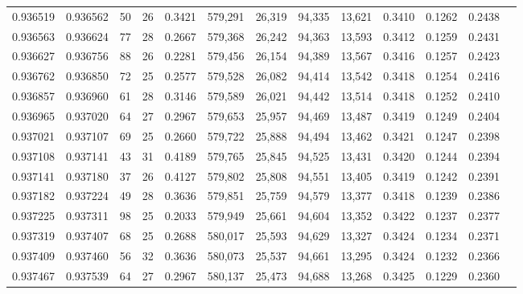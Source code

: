 \begin{tabular}{rrrrrrrrrrrrr}
0.936519 & 0.936562 &    50 &  26 &                                     0.3421 & 579,291 &  26,319 &  94,335 &  13,621 & 0.3410 & 0.1262 & 0.2438 \\
0.936563 & 0.936624 &    77 &  28 &                                     0.2667 & 579,368 &  26,242 &  94,363 &  13,593 & 0.3412 & 0.1259 & 0.2431 \\
0.936627 & 0.936756 &    88 &  26 &                                     0.2281 & 579,456 &  26,154 &  94,389 &  13,567 & 0.3416 & 0.1257 & 0.2423 \\
0.936762 & 0.936850 &    72 &  25 &                                     0.2577 & 579,528 &  26,082 &  94,414 &  13,542 & 0.3418 & 0.1254 & 0.2416 \\
0.936857 & 0.936960 &    61 &  28 &                                     0.3146 & 579,589 &  26,021 &  94,442 &  13,514 & 0.3418 & 0.1252 & 0.2410 \\
0.936965 & 0.937020 &    64 &  27 &                                     0.2967 & 579,653 &  25,957 &  94,469 &  13,487 & 0.3419 & 0.1249 & 0.2404 \\
0.937021 & 0.937107 &    69 &  25 &                                     0.2660 & 579,722 &  25,888 &  94,494 &  13,462 & 0.3421 & 0.1247 & 0.2398 \\
0.937108 & 0.937141 &    43 &  31 &                                     0.4189 & 579,765 &  25,845 &  94,525 &  13,431 & 0.3420 & 0.1244 & 0.2394 \\
0.937141 & 0.937180 &    37 &  26 &                                     0.4127 & 579,802 &  25,808 &  94,551 &  13,405 & 0.3419 & 0.1242 & 0.2391 \\
0.937182 & 0.937224 &    49 &  28 &                                     0.3636 & 579,851 &  25,759 &  94,579 &  13,377 & 0.3418 & 0.1239 & 0.2386 \\
0.937225 & 0.937311 &    98 &  25 &                                     0.2033 & 579,949 &  25,661 &  94,604 &  13,352 & 0.3422 & 0.1237 & 0.2377 \\
0.937319 & 0.937407 &    68 &  25 &                                     0.2688 & 580,017 &  25,593 &  94,629 &  13,327 & 0.3424 & 0.1234 & 0.2371 \\
0.937409 & 0.937460 &    56 &  32 &                                     0.3636 & 580,073 &  25,537 &  94,661 &  13,295 & 0.3424 & 0.1232 & 0.2366 \\
0.937467 & 0.937539 &    64 &  27 &                                     0.2967 & 580,137 &  25,473 &  94,688 &  13,268 & 0.3425 & 0.1229 & 0.2360 \\

\end{tabular}
